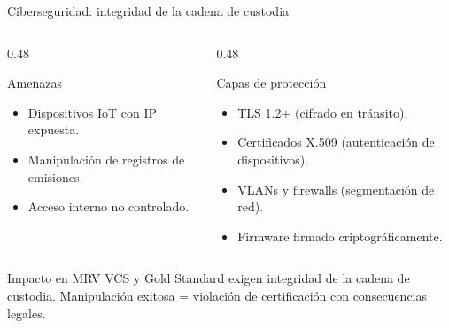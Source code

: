 \documentclass[aspectratio=169, 11pt]{beamer}
\begin{document}
\begin{frame}{Ciberseguridad: integridad de la cadena de custodia}
    \begin{columns}[T]
        \begin{column}{0.48\textwidth}
            \begin{alertblock}{Amenazas}
                \begin{itemize}
                    \item Dispositivos IoT con IP expuesta.
                    \item Manipulaci\'{o}n de registros de emisiones.
                    \item Acceso interno no controlado.
                \end{itemize}
            \end{alertblock}
        \end{column}
        \begin{column}{0.48\textwidth}
            \begin{block}{Capas de protecci\'{o}n}
                \begin{itemize}
                    \item TLS 1.2+ (cifrado en tr\'{a}nsito).
                    \item Certificados X.509 (autenticaci\'{o}n de dispositivos).
                    \item VLANs y firewalls (segmentaci\'{o}n de red).
                    \item Firmware firmado criptogr\'{a}ficamente.
                \end{itemize}
            \end{block}
        \end{column}
    \end{columns}

    \vfill
    \begin{alertblock}{Impacto en MRV}
        \centering
        VCS y Gold Standard exigen integridad de la cadena de custodia. Manipulaci\'{o}n exitosa = violaci\'{o}n de certificaci\'{o}n con consecuencias legales.
    \end{alertblock}
\end{frame}
\end{document}
